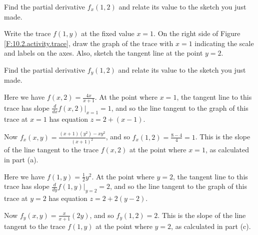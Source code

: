 \begin{activity}
   \item Find the partial derivative $f_x(1,2)$ and relate its value
     to the sketch you just made.

   \item Write the trace $f(1,y)$ at the fixed value $x=1$.  
     On the right side of Figure \ref{F:10.2.activity.trace},
     draw the graph of the trace with $x=1$ indicating the scale and
     labels on the axes.  Also, sketch 
     the tangent line at the point $y=2$.

   \item Find the partial derivative $f_y(1,2)$ and relate its value
     to the sketch you just made.


   \ea


\end{activity}

\begin{activitySolution}
\ba
\item Here we have $f(x,2) = \frac{4x}{x+1}$. At the point where $x=1$, the tangent line to this trace has slope $\frac{d}{dx} f(x,2) \left. \right|_{x=1} = 1$, and so the line tangent to the graph of this trace at $x=1$ has equation $z=2+(x-1)$. 
\item Now $f_x(x,y) = \frac{(x+1)(y^2) - xy^2}{(x+1)^2}$, and so $f_x(1,2) = \frac{8-4}{4} = 1$. This is the slope of the line tangent to the trace $f(x,2)$ at the point where $x=1$, as calculated in part (a). 
\item Here we have $f(1,y) = \frac{1}{2}y^2$. At the point where $y=2$, the tangent line to this trace has slope $\frac{d}{dy} f(1,y) \left. \right|_{y=2} = 2$, and so the line tangent to the graph of this trace at $y=2$ has equation $z=2+2(y-2)$. 
\item Now $f_y(x,y) = \frac{x}{x+1}(2y)$, and so $f_y(1,2) = 2$. This is the slope of the line tangent to the trace $f(1,y)$ at the point where $y=2$, as calculated in part (c).  
\ea
\end{activitySolution}

\aftera
